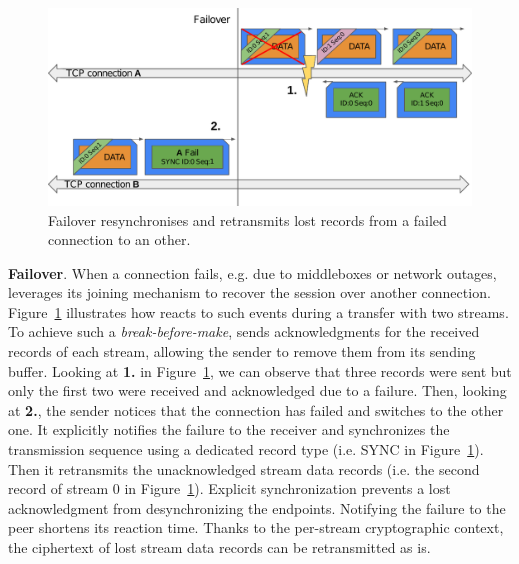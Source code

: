 \begin{figure}[!t]
	\begin{center}
		\includegraphics[width=\columnwidth]{figures/tcpls_failover}
	\end{center}
	\caption{Failover resynchronises and retransmits lost \tcpls records 
	from a failed \tcp connection to an other.}
	\label{fig:design-failover}
\end{figure}

\textbf{Failover}.
When a \tcp connection fails, e.g. due to middleboxes or network outages, 
\tcpls leverages its joining mechanism to recover 
the session over another \tcp connection. Figure~\ref{fig:design-failover} 
illustrates 
how \tcpls reacts to such events during a transfer with two \tcpls streams.
To achieve such a \emph{break-before-make}, 
\tcpls sends acknowledgments for the received records of each stream, allowing
the sender to remove them from its sending buffer.
Looking at \textbf{1.} in Figure~\ref{fig:design-failover}, we can observe that 
three records were sent but only the first two were received and acknowledged 
due to a failure.
Then, looking at \textbf{2.}, the sender notices that the \tcp connection has 
failed and switches to the other one. It explicitly notifies the failure to the 
receiver and synchronizes the transmission sequence using a 
dedicated \tcpls record type (i.e. SYNC in Figure~\ref{fig:design-failover}). 
Then it retransmits the unacknowledged stream data records (i.e. the second 
record of stream 0 in Figure~\ref{fig:design-failover}). 
Explicit synchronization %
prevents a lost acknowledgment from desynchronizing the endpoints. 
Notifying the failure to the peer shortens its reaction time.
Thanks to the per-stream cryptographic context, the ciphertext of lost stream 
data records can be retransmitted as is.

